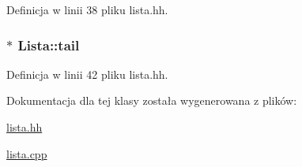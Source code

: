 Definicja w linii 38 pliku lista.\-hh.

\hypertarget{class_lista_a7d42e5f99e945d97c29d6f764f71f4e7}{
\subsubsection[{tail}]{$\ast$ Lista\-::tail\hspace{0.3cm}{\ttfamily [private]}}}\label{class_lista_a7d42e5f99e945d97c29d6f764f71f4e7}


Definicja w linii 42 pliku lista.\-hh.



Dokumentacja dla tej klasy została wygenerowana z plików\-:\begin{DoxyCompactItemize}
\item 
\hyperlink{lista_8hh}{lista.\-hh}\item 
\hyperlink{lista_8cpp}{lista.\-cpp}\end{DoxyCompactItemize}
